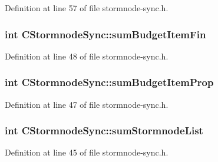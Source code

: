 Definition at line 57 of file stormnode-\/sync.\+h.

\hypertarget{class_c_stormnode_sync_ae54e3ff056c6bab202db68c4ceb0792e}{}
\subsubsection[{sum\+Budget\+Item\+Fin}]{\setlength{\rightskip}{0pt plus 5cm}int C\+Stormnode\+Sync\+::sum\+Budget\+Item\+Fin}\label{class_c_stormnode_sync_ae54e3ff056c6bab202db68c4ceb0792e}


Definition at line 48 of file stormnode-\/sync.\+h.

\hypertarget{class_c_stormnode_sync_a04a5e8c869c0b3802ce5ab2b8d0c7952}{}
\subsubsection[{sum\+Budget\+Item\+Prop}]{\setlength{\rightskip}{0pt plus 5cm}int C\+Stormnode\+Sync\+::sum\+Budget\+Item\+Prop}\label{class_c_stormnode_sync_a04a5e8c869c0b3802ce5ab2b8d0c7952}


Definition at line 47 of file stormnode-\/sync.\+h.

\hypertarget{class_c_stormnode_sync_a3049bd8c09a2b946e99bb1ffca5ebd97}{}
\subsubsection[{sum\+Stormnode\+List}]{\setlength{\rightskip}{0pt plus 5cm}int C\+Stormnode\+Sync\+::sum\+Stormnode\+List}\label{class_c_stormnode_sync_a3049bd8c09a2b946e99bb1ffca5ebd97}


Definition at line 45 of file stormnode-\/sync.\+h.

\hypertarget{class_c_stormnode_sync_a37b84e2f05256e44f9d0c80a87b26895}{}
